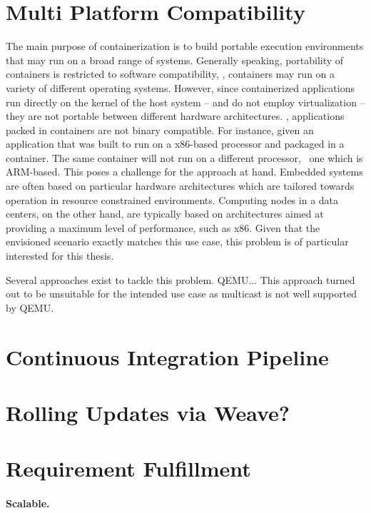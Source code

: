 \section{Multi Platform Compatibility}

The main purpose of containerization is to build portable execution environments that may run on a broad range of systems. Generally speaking, portability of containers is restricted to software compatibility, \ie , containers may run on a variety of different operating systems. However, since containerized applications run directly on the kernel of the host system -- and do not employ virtualization -- they are not portable between different hardware architectures. \Ie , applications packed in containers are not binary compatible. For instance, given an application that was built to run on a x86-based processor and packaged in a container. The same container will not run on a different processor, \eg\ one which is ARM-based. This poses a challenge for the approach at hand. Embedded systems are often based on particular hardware architectures which are tailored towards operation in resource constrained environments. Computing nodes in a data centers, on the other hand, are typically based on architectures aimed at providing a maximum level of performance, such as x86. Given that the envisioned scenario exactly matches this use case, this problem is of particular interested for this thesis.

Several approaches exist to tackle this problem. QEMU... This approach turned out to be unsuitable for the intended use case as multicast is not well supported by QEMU.


\section{Continuous Integration Pipeline}


\section{Rolling Updates via Weave?}



\section{Requirement Fulfillment}

\paragraph{Scalable.}

